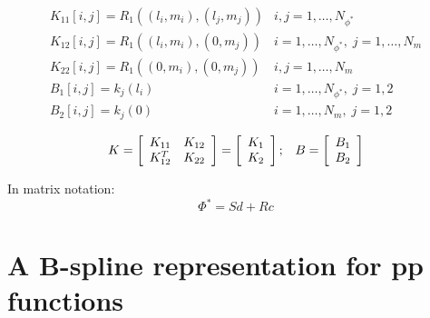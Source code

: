 \documentclass[12pt]{article}
\theoremstyle{definition}
\begin{document}
\[
\begin{array}{ll}
{K_{11}}\left[i,j\right] = R_1\left(\left(l_i,m_i\right),\left(l_j,m_j\right)\right) &  i,j = 1, \dots, N_{\phi^*}\\
{K_{12}}\left[i,j\right] = R_1\left(\left(l_i,m_i\right),\left(0,m_j\right)\right) &  i = 1, \dots, N_{\phi^*},\;j = 1, \dots, N_m \\
{K_{22}}\left[i,j\right] = R_1\left(\left(0,m_i\right),\left(0,m_j\right)\right) &  i,j = 1, \dots, N_m\\
B_1\left[i , j\right] = k_j\left(l_i\right) &  i = 1, \dots, N_{\phi^*},\;j = 1, 2\\
B_2\left[i , j\right] = k_j\left(0\right) &  i = 1, \dots, N_m,\;j = 1, 2\\
\end{array}
\]
\[
K = \left[\begin{array}{cc}
		K_{11} & K_{12}\\
		K_{12}^T & K_{22}
		\end{array}\right] = \left[\begin{array}{c}
		K_1\\
		K_2
		\end{array}\right]\\;\;\;\; B = \left[ \begin{array}{c}B_1\\
										       B_2\end{array}\right] \]


\noindent
In matrix notation:
\[
\Phi^* = S d + R c							
\]

%

\section{A B-spline representation for pp functions}
\end{document}
